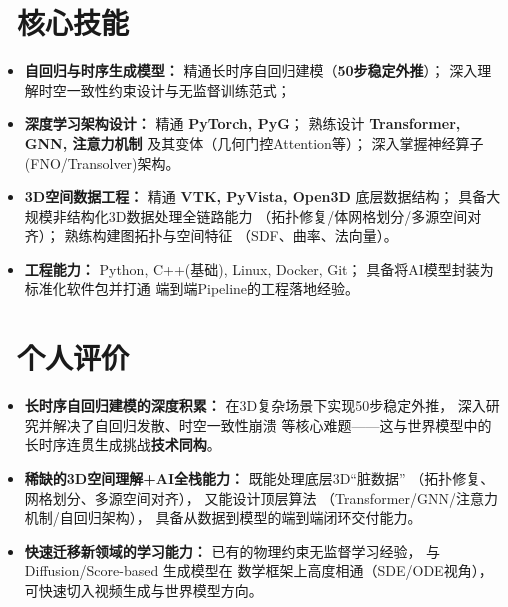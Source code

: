 \documentclass[11pt]{article}
\begin{document}
  
\section{\makebox[\widthof{\faCogs}][c]{\color{CVBlue}\faCogs}\ 核心技能}
\begin{itemize}
    \item \textbf{自回归与时序生成模型：}
      精通长时序自回归建模（\textbf{50步稳定外推}）；
      深入理解时空一致性约束设计与无监督训练范式；
    \item \textbf{深度学习架构设计：}
      精通 \textbf{PyTorch, PyG}；
      熟练设计 \textbf{Transformer, GNN, 注意力机制}
      及其变体（几何门控Attention等）；
      深入掌握神经算子(FNO/Transolver)架构。
    \item \textbf{3D空间数据工程：}
      精通 \textbf{VTK, PyVista, Open3D} 底层数据结构；
      具备大规模非结构化3D数据处理全链路能力
      （拓扑修复/体网格划分/多源空间对齐）；
      熟练构建图拓扑与空间特征
      （SDF、曲率、法向量）。
    \item \textbf{工程能力：}
      Python, C++(基础), Linux, Docker, Git；
      具备将AI模型封装为标准化软件包并打通
      端到端Pipeline的工程落地经验。
\end{itemize}

\section{\makebox[\widthof{\faUser}][c]{\color{CVBlue}\faUser}\ 个人评价}

\begin{itemize}
    \item \textbf{长时序自回归建模的深度积累：}
      在3D复杂场景下实现50步稳定外推，
      深入研究并解决了自回归发散、时空一致性崩溃
      等核心难题——这与世界模型中的
      长时序连贯生成挑战\textbf{技术同构}。
    \item \textbf{稀缺的3D空间理解+AI全栈能力：}
      既能处理底层3D``脏数据''
      （拓扑修复、网格划分、多源空间对齐），
      又能设计顶层算法
      （Transformer/GNN/注意力机制/自回归架构），
      具备从数据到模型的端到端闭环交付能力。
    \item \textbf{快速迁移新领域的学习能力：}
      已有的物理约束无监督学习经验，
      与 Diffusion/Score-based 生成模型在
      数学框架上高度相通（SDE/ODE视角），
      可快速切入视频生成与世界模型方向。
\end{itemize}
\end{document}
